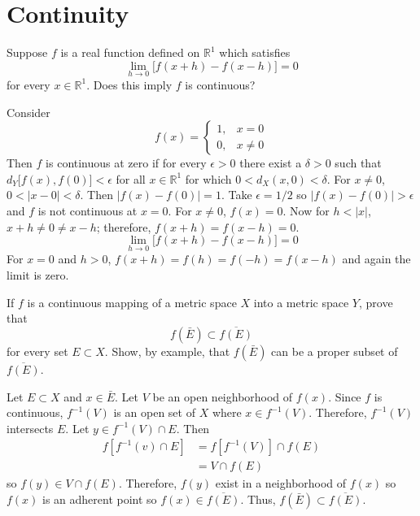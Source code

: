 \chapter{Continuity}
\label{ch4}

\begin{exercise}
\item
  Suppose \(f\) is a real function defined on \(\mathbb{R}^1\) which satisfies
  \[
  \lim_{h\to 0}\bigl[f(x + h) - f(x - h)\bigr] = 0
  \]
  for every \(x\in\mathbb{R}^1\).
  Does this imply \(f\) is continuous?
  \par\smallskip
  Consider
  \[
  f(x) =
  \begin{cases}
    1, & x = 0\\
    0, & x\neq 0
  \end{cases}
  \]
  Then \(f\) is continuous at zero if for every \(\epsilon > 0\) there exist a
  \(\delta > 0\) such that \(d_Y\bigl[f(x),f(0)\bigr] < \epsilon\) for all
  \(x\in\mathbb{R}^1\) for which \(0 < d_X(x,0) < \delta\).
  For \(x\neq 0\), \(0 < \lvert x - 0\rvert < \delta\).
  Then \(\lvert f(x) - f(0)\rvert = 1\).
  Take \(\epsilon = 1/2\) so \(\lvert f(x) - f(0)\rvert > \epsilon\) and \(f\)
  is not continuous at \(x = 0\).
  For \(x\neq 0\), \(f(x) = 0\).
  Now for \(h < \lvert x\rvert\), \(x + h\neq 0\neq x - h\); therefore,
  \(f(x + h) = f(x - h) = 0\).
  \[
  \lim_{h\to 0}\bigl[f(x + h) - f(x - h)\bigr] = 0
  \]
  For \(x = 0\) and \(h > 0\), \(f(x + h) = f(h) = f(-h) = f(x - h)\) and again
  the limit is zero.
\item
  If \(f\) is a continuous mapping of a metric space \(X\) into a metric space
  \(Y\), prove that
  \[
  f(\bar{E})\subset\overline{f(E)}
  \]
  for every set \(E\subset X\).
  Show, by example, that \(f(\bar{E})\) can be a proper subset of
  \(\overline{f(E)}\).
  \par\smallskip
  Let \(E\subset X\) and \(x\in\bar{E}\).
  Let \(V\) be an open neighborhood of \(f(x)\).
  Since \(f\) is continuous, \(f^{-1}(V)\) is an open set of \(X\) where
  \(x\in f^{-1}(V)\).
  Therefore, \(f^{-1}(V)\) intersects \(E\).
  Let \(y\in f^{-1}(V)\cap E\).
  Then
  \begin{align*}
    f[f^{-1}(v)\cap E] & = f[f^{-1}(V)]\cap f(E)\\
                       & = V\cap f(E)
  \end{align*}
  so \(f(y)\in V\cap f(E)\).
  Therefore, \(f(y)\) exist in a neighborhood of \(f(x)\) so \(f(x)\) is an
  adherent point so \(f(x)\in\overline{f(E)}\).
  Thus, \(f(\bar{E})\subset\overline{f(E)}\).

\end{exercise}
